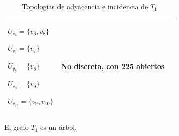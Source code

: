 \begin{table}[p]
\begin{tabular}{@{}>{\centering\arraybackslash}m{}>{\centering\arraybackslash}m{}>{\centering\arraybackslash}m{}@{}}
         ${U_{v_6}=\{v_6,v_8\}}$\par
         ${U_{v_7}=\{v_7\}}$\par
         ${U_{v_8}=\{v_8\}}$\par
         ${U_{v_9}=\{v_9\}}$\par
         ${U_{v_{10}}=\{v_9,v_{10}\}}$
      &
         No discreta, con 225 abiertos \\[6pt]
      \hline
   \end{tabular}
   \caption{Topologías de adyacencia e incidencia de $T_1$}
   \label{tab:topologias_T_1}

   \vspace{2em}
   \begin{minipage}{\textwidth}
      \normalsize
      El grafo $T_1$ es un árbol.
   \end{minipage}
\end{table}

